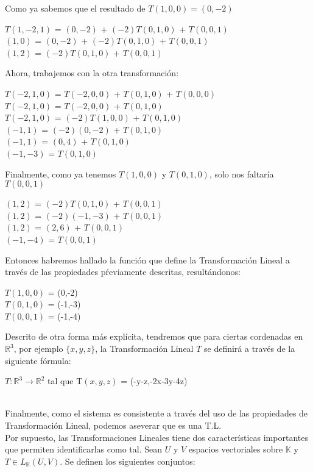 \documentclass[12pt]{article}
\begin{document}
Como ya sabemos que el resultado de $T(1,0,0) = (0, -2)$ 
\begin{center}
	$T(1,-2,1)$ = $(0,-2)$ + $(-2)T(0,1,0)$ + $T(0,0,1)$ \\
	$(1,0)$ = $(0,-2)$ + $(-2)T(0,1,0)$ + $T(0,0,1)$ \\
	$(1,2)$ = $(-2)T(0,1,0)$ + $T(0,0,1)$
\end{center}
Ahora, trabajemos con la otra transformación:
\begin{center}
	$T(-2,1,0)$ = $T(-2,0,0)$ + $T(0,1,0)$ + $T(0,0,0)$ \\
	$T(-2,1,0)$ = $T(-2,0,0)$ + $T(0,1,0)$ \\
	$T(-2,1,0)$ = $(-2)T(1,0,0)$ + $T(0,1,0)$ \\
	$(-1,1)$ = $(-2)(0,-2)$ + $T(0,1,0)$ \\
	$(-1,1)$ = $(0,4)$ + $T(0,1,0)$ \\
	$(-1,-3)$ = $T(0,1,0)$
\end{center}
Finalmente, como ya tenemos $T(1,0,0)$ y $T(0,1,0)$, solo nos faltaría $T(0,0,1)$
\begin{center}
	$(1,2)$ = $(-2)T(0,1,0)$ + $T(0,0,1)$ \\
	$(1,2)$ = $(-2)(-1,-3)$ + $T(0,0,1)$ \\
	$(1,2)$ = $(2,6)$ + $T(0,0,1)$ \\
	$(-1,-4)$ = $T(0,0,1)$
\end{center}
Entonces habremos hallado la función que define la Transformación Lineal a través
de las propiedades pŕeviamente descritas, resultándonos:
\begin{center}
	$T(1,0,0)$ = (0,-2) \\
	$T(0,1,0)$ = (-1,-3) \\
	$T(0,0,1)$ = (-1,-4)
\end{center}
Descrito de otra forma más explícita, tendremos que para ciertas cordenadas en 
$\mathbb{R}^3$, por ejemplo $\{x,y,z\}$, la Transformación Lineal $T$ se definirá
a través de la siguiente fórmula:
\begin{center}
$T:\mathbb{R}^3\to\mathbb{R}^2$ tal que T$(x,y,z)$ = (-y-z,-2x-3y-4z)
\end{center}
\\
Finalmente, como el sistema es consistente a través del uso de las propiedades
de Transformación Lineal, podemos aseverar que es una T.L.
\newpage
\\
Por supuesto, las Transformaciones Lineales tiene dos características importantes
que permiten identificarlas como tal. Sean $U$ y $V$ espacios vectoriales sobre
$\mathbb{K}$ y $T \in L_\mathbb{K} (U,V)$. Se definen los siguientes conjuntos:
\end{document}
